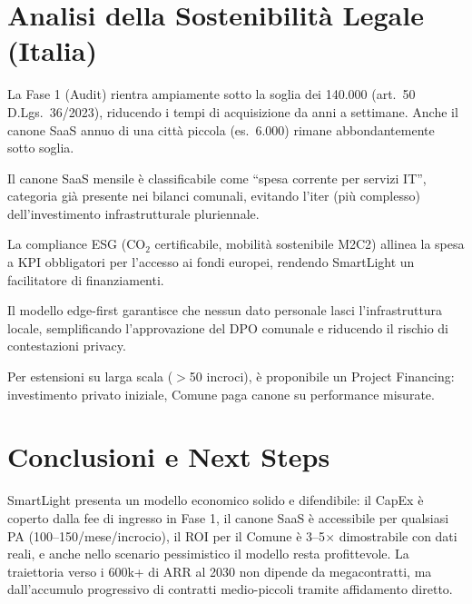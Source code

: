 \documentclass[a4paper,11pt]{article}
\begin{document}
\section{Analisi della Sostenibilità Legale (Italia)}

\begin{description}[style=multiline, leftmargin=4.5cm, font=\bfseries\color{SmartBlue}]
    \item[Affidamento Diretto] La Fase 1 (Audit) rientra ampiamente sotto la soglia dei \texteuro{}140.000 (art.\ 50 D.Lgs.\ 36/2023), riducendo i tempi di acquisizione da anni a settimane. Anche il canone SaaS annuo di una città piccola (es.\ \texteuro{}6.000) rimane abbondantemente sotto soglia.
    \item[Spesa Corrente IT] Il canone SaaS mensile è classificabile come ``spesa corrente per servizi IT'', categoria già presente nei bilanci comunali, evitando l'iter (più complesso) dell'investimento infrastrutturale pluriennale.
    \item[PNRR / Green Deal] La compliance ESG (CO$_2$ certificabile, mobilità sostenibile M2C2) allinea la spesa a KPI obbligatori per l'accesso ai fondi europei, rendendo SmartLight un facilitatore di finanziamenti.
    \item[GDPR Compliance] Il modello edge-first garantisce che nessun dato personale lasci l'infrastruttura locale, semplificando l'approvazione del DPO comunale e riducendo il rischio di contestazioni privacy.
    \item[Project Financing] Per estensioni su larga scala ($>$50 incroci), è proponibile un Project Financing: investimento privato iniziale, Comune paga canone su performance misurate.
\end{description}

\section{Conclusioni e Next Steps}

SmartLight presenta un modello economico solido e difendibile: il CapEx è coperto
dalla fee di ingresso in Fase 1, il canone SaaS è accessibile per qualsiasi PA
(\texteuro{}100--150/mese/incrocio), il ROI per il Comune è 3--5$\times$ dimostrabile
con dati reali, e anche nello scenario pessimistico il modello resta profittevole.
La traiettoria verso i \texteuro{}600k+ di ARR al 2030 non dipende da megacontratti,
ma dall'accumulo progressivo di contratti medio-piccoli tramite affidamento diretto.
\end{document}
